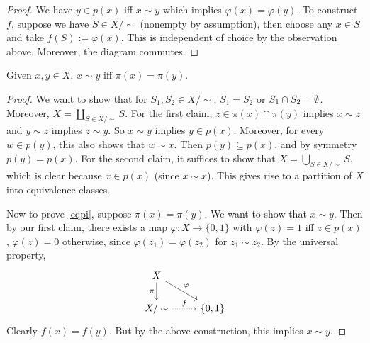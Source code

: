     \begin{proof}
        We have $y \in p(x)$ iff $x\sim y$ which implies $\varphi (x)=\varphi (y)$. To construct $f $, suppose we have $S \in X /\sim$ (nonempty by assumption), then choose any $x \in S$ and take $f(S):= \varphi (x)$. This is independent of choice by the observation above. Moreover, the diagram commutes.
    \end{proof}
    \begin{lemma}\label{eqpi} 
        Given $x,y \in X$, $x \sim y$ iff $\pi(x)=\pi(y)$.
    \end{lemma}
    \begin{proof}
        We want to show that for $S_1 ,S_2 \in X / \sim$, $S_1=S_2$ or $S_1 \cap S_2 = \emptyset$. Moreover, $X = \coprod _{S \in X /\sim}S$. For the first claim, $z \in \pi(x) \cap \pi(y)$ implies $x \sim z$ and $y \sim z$ implies $z \sim y$. So $x\sim y$ implies $y \in p(x)$. Moreover, for every $w \in p(y)$, this also shows that $w \sim  x$. Then $p(y) \subseteq p(x)$, and by symmetry $p(y)=p(x)$. For the second claim, it suffices to show that $X = \bigcup_{S \in X /\sim} S$, which is clear because $x \in p(x)$ (since $x \sim x$). This gives rise to a partition of $X$ into equivalence classes.

        Now to prove \cref{eqpi}, suppose $\pi(x)=\pi(y)$. We want to show that $x \sim y$. Then by our first claim, there exists a map $\varphi  \colon X \to \{0,1\} $ with $\varphi (z)=1 $ iff $ z \in p(x)$, $\varphi (z)=0$ otherwise, since $\varphi (z_1)=\varphi (z_2)$ for $z_1\sim z_2$. By the universal property, 
        \[
        \begin{tikzcd}
X \arrow[d, "\pi"'] \arrow[rd, "\varphi"] &           \\
X /\sim \arrow[r, "f", dotted]            & {\{0,1\}}
\end{tikzcd}
        \] Clearly $f(x)=f(y)$. But by the above construction, this implies $x\sim y$.
    \end{proof}
